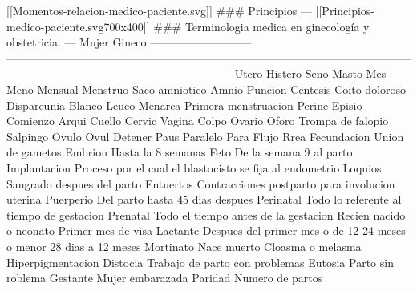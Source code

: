 \documentclass[
]{article}
\begin{document}
{[}{[}Momentos-relacion-medico-paciente.svg{]}{]} \#\#\# Principios ---
{[}{[}Principios-medico-paciente.svg\textbar700x400{]}{]} \#\#\#
Terminologia medica en ginecología y obstetricia. --- \textbar{} Mujer
\textbar{} Gineco \textbar{} \textbar{} ---------------------------
\textbar{}
------------------------------------------------------------------------------------------------------------------------------------------------------------------------
\textbar{} \textbar{} Utero \textbar{} Histero \textbar{} \textbar{}
Seno \textbar{} Masto \textbar{} \textbar{} Mes \textbar{} Meno
\textbar{} \textbar{} Mensual \textbar{} Menstruo \textbar{} \textbar{}
Saco amniotico \textbar{} Amnio \textbar{} \textbar{} Puncion \textbar{}
Centesis \textbar{} \textbar{} Coito doloroso \textbar{} Dispareunia
\textbar{} \textbar{} Blanco \textbar{} Leuco \textbar{} \textbar{}
Menarca \textbar{} Primera menstruacion \textbar{} \textbar{} Perine
\textbar{} Episio \textbar{} \textbar{} Comienzo \textbar{} Arqui
\textbar{} \textbar{} Cuello \textbar{} Cervic \textbar{} \textbar{}
Vagina \textbar{} Colpo \textbar{} \textbar{} Ovario \textbar{} Oforo
\textbar{} \textbar{} Trompa de falopio \textbar{} Salpingo \textbar{}
\textbar{} Ovulo \textbar{} Ovul \textbar{} \textbar{} Detener
\textbar{} Paus \textbar{} \textbar{} Paralelo \textbar{} Para
\textbar{} \textbar{} Flujo \textbar{} Rrea \textbar{} \textbar{}
Fecundacion \textbar{} Union de gametos \textbar{} \textbar{} Embrion
\textbar{} Hasta la 8 semanas \textbar{} \textbar{} Feto \textbar{} De
la semana 9 al parto \textbar{} \textbar{} Implantacion \textbar{}
Proceso por el cual el blastocisto se fija al endometrio \textbar{}
\textbar{} Loquios \textbar{} Sangrado despues del parto \textbar{}
\textbar{} Entuertos \textbar{} Contracciones postparto para involucion
uterina \textbar{} \textbar{} Puerperio \textbar{} Del parto hasta 45
dias despues \textbar{} \textbar{} Perinatal \textbar{} Todo lo
referente al tiempo de gestacion \textbar{} \textbar{} Prenatal
\textbar{} Todo el tiempo antes de la gestacion \textbar{} \textbar{}
Recien nacido o neonato \textbar{} Primer mes de visa \textbar{}
\textbar{} Lactante \textbar{} Despues del primer mes o de 12-24 meses o
menor 28 dias a 12 meses \textbar{} \textbar{} Mortinato \textbar{} Nace
muerto \textbar{} \textbar{} Cloasma o melasma \textbar{}
Hiperpigmentacion \textbar{} \textbar{} Distocia \textbar{} Trabajo de
parto con problemas \textbar{} \textbar{} Eutosia \textbar{} Parto sin
roblema \textbar{} \textbar{} Gestante \textbar{} Mujer embarazada
\textbar{} \textbar{} Paridad \textbar{} Numero de partos \textbar{}
\end{document}
